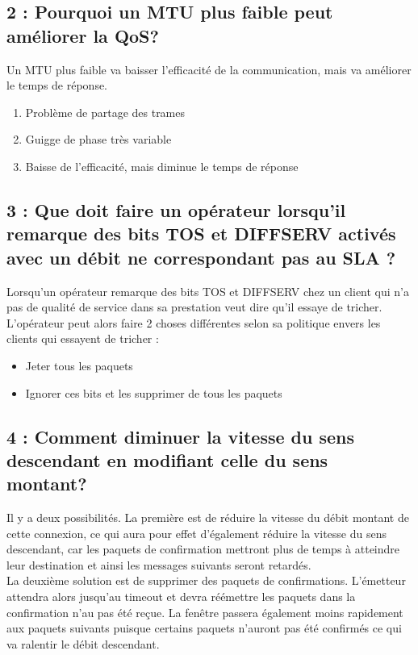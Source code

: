 \documentclass{article}
\begin{document}
\subsection*{2 : Pourquoi un MTU plus faible peut améliorer la QoS?}

Un MTU plus faible va baisser l'efficacité de la communication, mais va améliorer le temps de réponse.
\begin{enumerate}
\item Problème de partage des trames
\item Guigge de phase très variable
\item Baisse de l'efficacité, mais diminue le temps de réponse
\end{enumerate}

\subsection*{3 : Que doit faire un opérateur lorsqu'il remarque des bits TOS et DIFFSERV activés avec un débit ne correspondant pas au SLA ?}

Lorsqu'un opérateur remarque des bits TOS \cite{ToS} et DIFFSERV \cite{DiffServ} chez un client qui n'a pas de qualité de service dans sa prestation veut dire qu'il essaye de tricher.\\

L'opérateur peut alors faire 2 choses différentes selon sa politique envers les clients qui essayent de tricher : 

\begin{itemize}
 	\item Jeter tous les paquets
 	\item Ignorer ces bits et les supprimer de tous les paquets
\end{itemize}

\subsection*{4 : Comment diminuer la vitesse du sens descendant en modifiant celle du sens montant?}

Il y a deux possibilités. La première est de réduire la vitesse du débit montant de cette connexion, ce qui aura pour effet d'également réduire la vitesse du sens descendant, car les paquets de confirmation mettront plus de temps à atteindre leur destination et ainsi les messages suivants seront retardés.\\

La deuxième solution est de supprimer des paquets de confirmations. L'émetteur attendra alors jusqu'au timeout et devra réémettre les paquets dans la confirmation n'au pas été reçue. La fenêtre passera également moins rapidement aux paquets suivants puisque certains paquets n'auront pas été confirmés ce qui va ralentir le débit descendant.
\end{document}
